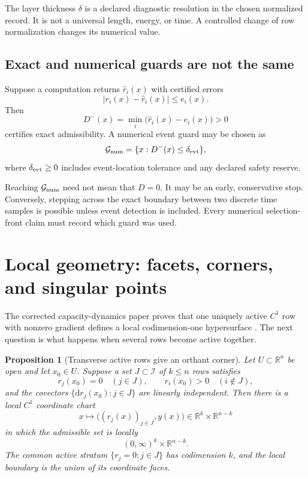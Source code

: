 \documentclass[11pt]{article}
\newtheorem{proposition}[theorem]{Proposition}
\theoremstyle{definition}
\theoremstyle{remark}
\newcommand{\cG}{\mathcal G}
\newcommand{\cI}{\mathcal I}
\newcommand{\RR}{\mathbb R}
\newcommand{\dd}{\mathrm d}
\begin{document}
The layer thickness \(\delta\) is a declared diagnostic resolution in the
chosen normalized record.  It is not a universal length, energy, or time.
A controlled change of row normalization changes its numerical value.

\subsection{Exact and numerical guards are not the same}

Suppose a computation returns \(\widehat r_i(x)\) with certified errors
\[
 |r_i(x)-\widehat r_i(x)|\le e_i(x).
\]
Then
\[
 D^-(x)=\min_i\bigl(\widehat r_i(x)-e_i(x)\bigr)>0
\]
certifies exact admissibility.  A numerical event guard may be chosen as
\[
 \cG_{\rm num}
 =
 \{x:D^-(x)\le\delta_{\rm evt}\},
\]
where \(\delta_{\rm evt}\ge0\) includes event-location tolerance and any
declared safety reserve.

Reaching \(\cG_{\rm num}\) need not mean that \(D=0\).  It may be an early,
conservative stop.  Conversely, stepping across the exact boundary between
two discrete time samples is possible unless event detection is included.
Every numerical selection-front claim must record which guard was used.

\section{Local geometry: facets, corners, and singular points}
\label{sec:geometry}

The corrected capacity-dynamics paper proves that one uniquely active
\(C^1\) row with nonzero gradient defines a local codimension-one
hypersurface \cite{CapacityDynamics2026}.  The next question is what happens
when several rows become active together.

\begin{proposition}[Transverse active rows give an orthant corner]
\label{prop:corner}
Let \(U\subset\RR^n\) be open and let \(x_0\in U\).  Suppose a set
\(J\subset\cI\) of \(k\le n\) rows satisfies
\[
 r_j(x_0)=0\quad(j\in J),
 \qquad
 r_i(x_0)>0\quad(i\notin J),
\]
and the covectors
\(\{\dd r_j(x_0):j\in J\}\) are linearly independent.  Then there is a
local \(C^1\) coordinate chart
\[
 x\longmapsto
 \bigl((r_j(x))_{j\in J},y(x)\bigr)
 \in\RR^k\times\RR^{n-k}
\]
in which the admissible set is locally
\[
 (0,\infty)^k\times\RR^{n-k}.
\]
The common active stratum \(\{r_j=0:j\in J\}\) has codimension \(k\), and
the local boundary is the union of its coordinate faces.
\end{proposition}
\end{document}
